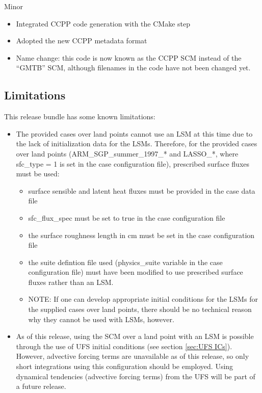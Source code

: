 Minor
\begin{itemize}
\item Integrated CCPP code generation with the CMake step
\item Adopted the new CCPP metadata format
\item Name change: this code is now known as the CCPP SCM instead of the ``GMTB'' SCM, although filenames in the code have not been changed yet.
\end{itemize}

\subsection{Limitations}

This release bundle has some known limitations:

\begin{itemize}
\item The provided cases over land points cannot use an LSM at this time due to the lack of initialization data for the LSMs. Therefore, for the provided cases over land points (ARM\_SGP\_summer\_1997\_* and LASSO\_*, where sfc\_type = 1 is set in the case configuration file), prescribed surface fluxes must be used:
\begin{itemize}
\item surface sensible and latent heat fluxes must be provided in the case data file
\item sfc\_flux\_spec must be set to true in the case configuration file
\item the surface roughness length in cm must be set in the case configuration file
\item the suite defintion file used (physics\_suite variable in the case configuration file) must have been modified to use prescribed surface fluxes rather than an LSM.
\item NOTE: If one can develop appropriate initial conditions for the LSMs for the supplied cases over land points, there should be no technical reason why they cannot be used with LSMs, however.
\end{itemize}
\item As of this release, using the SCM over a land point with an LSM is possible through the use of UFS initial conditions (see section \ref{sec:UFS ICs}). However, advective forcing terms are unavailable as of this release, so only short integrations using this configuration should be employed. Using dynamical tendencies (advective forcing terms) from the UFS will be part of a future release.
\end{itemize}
